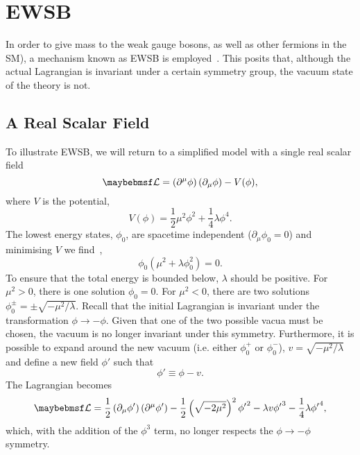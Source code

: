 \section{\acl{EWSB}}
\label{sec:theory_ewsb}
In order to give mass to the weak gauge bosons, as well as other fermions in the
\ac{SM}), a mechanism known as \acf{EWSB} is employed~\cite{ewsb_intro}. This
posits that, although the actual Lagrangian is invariant under a certain
symmetry group, the vacuum state of the theory is not.

\subsection{A Real Scalar Field}
To illustrate \ac{EWSB}, we will return to a simplified model with a single real
scalar field
\begin{equation*}
\lagrangiand = \left(\partial^{\mu}\phi\right)\left(\partial_{\mu}\phi\right)
-V(\phi),
\end{equation*}
where $V$ is the potential,
\begin{equation*}
V(\phi) = \frac{1}{2}\mu^2\phi^2 + \frac{1}{4}\lambda\phi^4.
\end{equation*}
The lowest energy states, $\phi_0$, are spacetime independent ($\partial_{\mu}
\phi_0 = 0$) and minimising $V$ we find~\cite{qft_nutshell},
\begin{equation*}
\phi_0 \left (\mu^2 + \lambda\phi_0^2\right) = 0.
\end{equation*}
To ensure that the total energy is bounded below, $\lambda$ should be
positive. For $\mu^2 > 0$, there is one solution $\phi_0 = 0$. For $\mu^2 < 0$,
there are two solutions $\phi^\pm_0 = \pm \sqrt{-\mu^2/\lambda}$. Recall that
the initial Lagrangian is invariant under the transformation $\phi
\longrightarrow -\phi$. Given that one of the two possible vacua must be chosen,
the vacuum is no longer invariant under this symmetry. Furthermore, it is
possible to expand around the new vacuum (i.e. either $\phi_0^+$ or $\phi_0^-$),
$v=\sqrt{-\mu^2/\lambda}$ and define a new field $\phi'$ such that
\begin{equation*}
\phi' \equiv \phi - v.
\end{equation*}
The Lagrangian becomes
\begin{equation*}
\lagrangiand = \frac{1}{2}
\left(\partial_{\mu}\phi'\right)\left(\partial^{\mu}\phi'\right)
-\frac{1}{2}\left(\sqrt{-2\mu^2}\right)^2{\phi'}^2 - \lambda v {\phi'}^3
-\frac{1}{4}\lambda{\phi'}^4,
\end{equation*}
which, with the addition of the $\phi^3$ term, no longer respects the $\phi
\longrightarrow -\phi$ symmetry.

